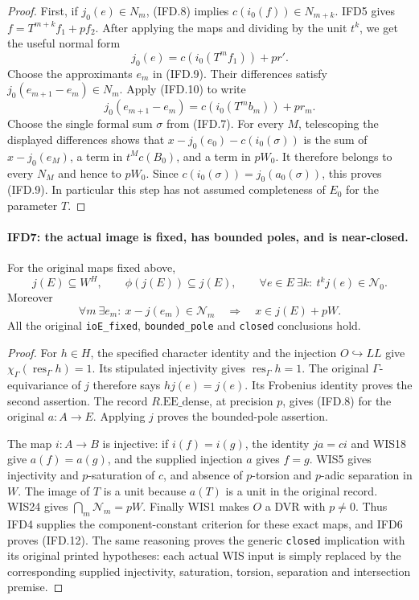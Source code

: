 \documentclass[11pt,a4paper]{article}
\numberwithin{equation}{section}
\theoremstyle{remark}\newtheorem{remark}[theorem]{Remark}
\begin{document}
\begin{proof}
First, if $j_0(e)\in N_m$, (IFD.8) implies
$c(i_0(f))\in N_{m+k}$. IFD5 gives
$f=T^{m+k}f_1+pf_2$. After applying the maps and dividing by the
unit $t^k$, we get the useful normal form
\[
                     j_0(e)=c(i_0(T^mf_1))+pr'.             \tag{IFD.10}
\]
Choose the approximants $e_m$ in (IFD.9). Their differences satisfy
$j_0(e_{m+1}-e_m)\in N_m$. Apply (IFD.10) to write
\[
                     j_0(e_{m+1}-e_m)=c(i_0(T^mb_m))+pr_m.
\]
Choose the single formal sum $\sigma$ from (IFD.7).
For every $M$, telescoping the displayed differences shows that
$x-j_0(e_0)-c(i_0(\sigma))$ is the sum of $x-j_0(e_M)$,
a term in $t^Mc(B_0)$, and a term in $pW_0$.
It therefore belongs to every $N_M$ and hence to $pW_0$.
Since $c(i_0(\sigma))=j_0(a_0(\sigma))$, this proves (IFD.9).
In particular this step has not assumed completeness of $E_0$
for the parameter $T$.
\end{proof}

\paragraph{IFD7: the actual image is fixed, has bounded poles, and is near-closed.}
\label{claim:IFD7}
For the original maps fixed above,
\[
 j(E)\subseteq W^H,\qquad \phi(j(E))\subseteq j(E),\qquad
 \forall e\in E\ \exists k:\ t^kj(e)\in\mathcal N_0.       \tag{IFD.11}
\]
Moreover
\[
 \forall m\ \exists e_m:\ x-j(e_m)\in\mathcal N_m
               \quad\Longrightarrow\quad x\in j(E)+pW.    \tag{IFD.12}
\]
All the original \texttt{io\allowbreak E\_\allowbreak fixed}, \texttt{bounded\_\allowbreak pole} and
\texttt{closed} conclusions hold.

\begin{proof}
For $h\in H$, the specified character identity and the injection
$O\hookrightarrow LL$ give $\chi_\Gamma(\operatorname{res}_\Gamma h)=1$.
Its stipulated injectivity gives $\operatorname{res}_\Gamma h=1$.
The original $\Gamma$-equivariance of $j$ therefore says $hj(e)=j(e)$.
Its Frobenius identity proves the second assertion.
The record $R.\mathrm{EE\_\allowbreak dense}$, at precision $p$, gives (IFD.8)
for the original $a:A\to E$. Applying $j$ proves the bounded-pole
assertion.

The map $i:A\to B$ is injective: if $i(f)=i(g)$, the identity
$ja=ci$ and WIS18 give $a(f)=a(g)$, and the supplied injection $a$
gives $f=g$. WIS5 gives injectivity and $p$-saturation of $c$,
and absence of $p$-torsion and $p$-adic separation in $W$.
The image of $T$ is a unit because $a(T)$ is a unit in the original
record. WIS24 gives $\bigcap_m\mathcal N_m=pW$.
Finally WIS1 makes $O$ a DVR with $p\ne0$.
Thus IFD4 supplies the component-constant criterion for these exact
maps, and IFD6 proves (IFD.12). The same reasoning proves the generic
\texttt{closed} implication with its original printed hypotheses:
each actual WIS input is simply replaced by the corresponding supplied
injectivity, saturation, torsion, separation and intersection premise.
\end{proof}
\end{document}
